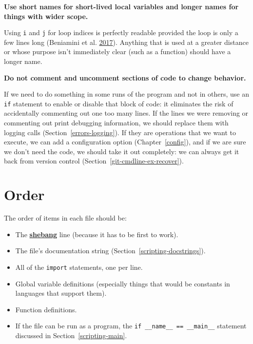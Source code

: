 \documentclass[
]{krantz}
\providecommand{\tightlist}{%
  \setlength{\itemsep}{0pt}\setlength{\parskip}{0pt}}
\newcommand{\gref}[2]{\hyperlink{#2}{\textbf{#1}}}
\begin{document}
\textbf{Use short names for short-lived local variables and longer names for things with wider scope.}

Using \texttt{i} and \texttt{j} for loop indices is perfectly readable
provided the loop is only a few lines long (Beniamini et al. \protect\hyperlink{ref-Beni2017}{2017}).
Anything that is used at a greater distance
or whose purpose isn't immediately clear
(such as a function) should have a longer name.

\textbf{Do not comment and uncomment sections of code to change behavior.}

If we need to do something in some runs of the program and not in others,
use an \texttt{if} statement to enable or disable that block of code:
it eliminates the risk of accidentally commenting out one too many lines.
If the lines we were removing or commenting out print debugging information,
we should replace them with logging calls (Section~\ref{errors-logging}).
If they are operations that we want to execute,
we can add a configuration option (Chapter~\ref{config}),
and if we are sure we don't need the code,
we should take it out completely:
we can always get it back from version control
(Section~\ref{git-cmdline-ex-recover}).

\hypertarget{style-order}{%
\section{Order}\label{style-order}}

The order of items in each file should be:

\begin{itemize}
\tightlist
\item
  The \gref{shebang}{shebang} line (because it has to be first to work).
\item
  The file's documentation string (Section~\ref{scripting-docstrings}).
\item
  All of the \texttt{import} statements, one per line.
\item
  Global variable definitions
  (especially things that would be constants in languages that support them).
\item
  Function definitions.
\item
  If the file can be run as a program,
  the \texttt{if\ \_\_name\_\_\ ==\ \textquotesingle{}\_\_main\_\_\textquotesingle{}} statement discussed in
  Section~\ref{scripting-main}.
\end{itemize}
\end{document}

